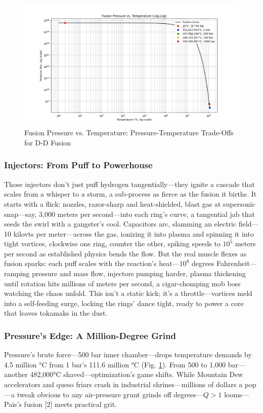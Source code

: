\documentclass[11pt]{article}
\begin{document}
	\vspace{1cm} %
	\begin{figure}[h]
		\centering
		\includegraphics[width=\textwidth]{fusion_curve.png}
		\caption{Fusion Pressure vs. Temperature: Pressure-Temperature Trade-Offs for D-D Fusion}
		\label{fig:flowchart}
	\end{figure}
	
	\subsubsection{Injectors: From Puff to Powerhouse}
	Those injectors don’t just puff hydrogen tangentially—they ignite a cascade that scales from a whisper to a storm, a sub-process as fierce as the fusion it births. It starts with a flick: nozzles, razor-sharp and heat-shielded, blast gas at supersonic snap—say, 3,000 meters per second—into each ring’s curve, a tangential jab that seeds the swirl with a gangster’s cool. Capacitors arc, slamming an electric field—10 kilovts per meter—across the gas, ionizing it into plasma and spinning it into tight vortices, clockwise one ring, counter the other, spiking speeds to $10^5$ meters per second as established physics bends the flow. But the real muscle flexes as fusion sparks: each puff scales with the reaction’s heat—$10^8$ degrees Fahrenheit—ramping pressure and mass flow, injectors pumping harder, plasma thickening until rotation hits millions of meters per second, a cigar-chomping mob boss watching the chaos unfold. This isn’t a static kick; it’s a throttle—vortices meld into a self-feeding surge, locking the rings’ dance tight, ready to power a core that leaves tokamaks in the dust.
	
	\subsubsection{Pressure’s Edge: A Million-Degree Grind}
	Pressure’s brute force—500 bar inner chamber—drops temperature demands by 4.5 million °C from 1 bar’s 111.6 million °C (Fig. \ref{fig:flowchart}). From 500 to 1,000 bar—another 482,000°C shaved—optimization’s game shifts. While Mountain Dew accelerators and queso friars crash in industrial shrines—millions of dollars a pop—a tweak obvious to any air-pressure grunt grinds off degrees—\(Q > 1\) looms—Pais’s fusion [2] meets practical grit.
	
\end{document}
